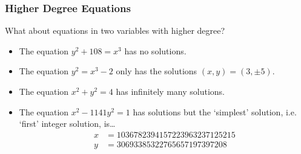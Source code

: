 \begin{frame}[plain]
\end{frame}



\begin{frame}[plain] \frametitle{Higher Degree Equations}

What about equations in two variables with higher degree? \vspace{0.3cm}

\begin{ex}
	\begin{itemize}
	\item The equation $y^2 + 108= x^3$ has no solutions. \vspace{0.3cm}
	\item The equation $y^2= x^3 - 2$ only has the solutions $(x, y)= (3, \pm 5)$. \vspace{0.3cm}
	\item The equation $x^2 + y^2= 4$ has infinitely many solutions. \vspace{0.3cm}
	\item The equation $x^2 - 1141y^2= 1$ has solutions but the `simplest' solution, i.e. `first' integer solution, is\dots
		\[
		\begin{aligned}
		x&= 1036782394157223963237125215 \\
		y&= 30693385322765657197397208
		\end{aligned}
		\]
	\end{itemize}
\end{ex}
\end{frame}



